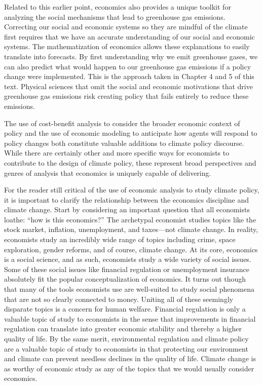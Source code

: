 Related to this earlier point, economics also provides a unique toolkit for analyzing the social mechanisms that lead to greenhouse gas emissions. Correcting our social and economic systems so they are mindful of the climate first requires that we have an accurate understanding of our social and economic systems. The mathematization of economics allows these explanations to easily translate into forecasts. By first understanding why we emit greenhouse gases, we can also predict what would happen to our greenhouse gas emissions if a policy change were implemented. This is the approach taken in Chapter 4 and 5 of this text. Physical sciences that omit the social and economic motivations that drive greenhouse gas emissions risk creating policy that fails entirely to reduce these emissions. 

The use of cost-benefit analysis to consider the broader economic context of policy and the use of economic modeling to anticipate how agents will respond to policy changes both constitute valuable additions to climate policy discourse. While there are certainly other and more specific ways for economists to contribute to the design of climate policy, these represent broad perspectives and genres of analysis that economics is uniquely capable of delivering. 

For the reader still critical of the use of economic analysis to study climate policy, it is important to clarify the relationship between the economics discipline and climate change. Start by considering an important question that all economists loathe: ``how is this economics?'' The archetypal economist studies topics like the stock market, inflation, unemployment, and taxes---not climate change. In reality, economists study an incredibly wide range of topics including crime, space exploration, gender reforms, and of course, climate change. At its core, economics is a social science, and as such, economists study a wide variety of social issues. Some of these social issues like financial regulation or unemployment insurance absolutely fit the popular conceptualization of economics. It turns out though that many of the tools economists use are well-suited to study social phenomena that are not so clearly connected to money. Uniting all of these seemingly disparate topics is a concern for human welfare. Financial regulation is only a valuable topic of study to economists in the sense that improvements in financial regulation can translate into greater economic stability and thereby a higher quality of life. By the same merit, environmental regulation and climate policy are a valuable topic of study to economists in that protecting our environment and climate can prevent needless declines in the quality of life. Climate change is as worthy of economic study as any of the topics that we would usually consider economics.


